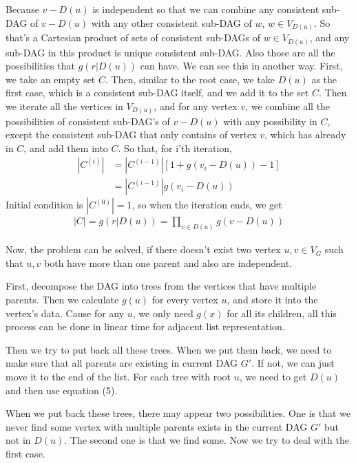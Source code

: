 \documentclass[11pt]{article}
\begin{document}
	
	
	\bigskip
	Because $v-D(u)$ is independent so that we can combine any consistent sub-DAG of $v-D(u)$ with any other consistent sub-DAG of $w$, $w \in V_{D(u)}$. So that's a Cartesian product of sets of consistent sub-DAGs of $w \in V_{D(u)}$, and any sub-DAG in this product is unique consistent sub-DAG. Also those are all the possibilities that $g(r|D(u))$ can have. We can see this in another way. First, we take an empty set $C$. Then, similar to the root case, we take $D(u)$ as the first case, which is a consistent sub-DAG itself, and we add it to the set $C$. Then we iterate all the vertices in $V_{D(u)}$, and for any vertex $v$, we combine all the possibilities of consistent sub-DAG's of $v-D(u)$ with any possibility in $C$, except the consistent sub-DAG that only contains of vertex $v$, which has already in $C$, and add them into $C$. So that, for i'th iteration,
	\begin{align*}
		|C^{(i)}| &= |C^{(i-1)}| [1 + g(v_i-D(u)) - 1]\\
			&= |C^{(i-1)}| g(v_i-D(u))
	\end{align*}
	Initial condition is $|C^{(0)}| = 1$, so when the iteration ends, we get 
	\begin{align*}
		|C| = g(r|D(u)) = \prod_{v \in D(u)}g(v-D(u))
	\end{align*}
	
	\bigskip
	Now, the problem can be solved, if there doesn't exist two vertex $u, v \in V_G$ such that $u, v$ both have more than one parent and also are independent.
	
	
	\bigskip
	First, decompose the DAG into trees from the vertices that have multiple parents. Then we calculate $g(u)$ for every vertex $u$, and store it into the vertex's data. Cause for any $u$, we only need $g(x)$ for all its children, all this process can be done in linear time for adjacent list representation.
	
	\bigskip
	Then we try to put back all these trees. When we put them back, we need to make sure that all parents are existing in current DAG $G'$. If not, we can just move it to the end of the list. For each tree with root $u$, we need to get $D(u)$ and then use equation (5).
	
	\bigskip
	When we put back these trees, there may appear two possibilities. One is that we never find some vertex with multiple parents exists in the current DAG $G'$ but not in $D(u)$. The second one is that we find some. Now we try to deal with the first case.
	
\end{document}
